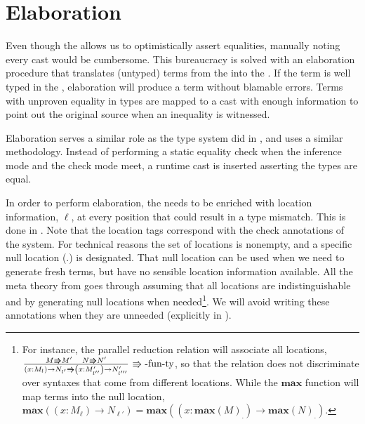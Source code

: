 \section{Elaboration}


Even though the \clang{} allows us to optimistically assert equalities, manually noting every cast would be cumbersome.
This bureaucracy is solved with an elaboration procedure that translates (untyped) terms from the \slang{} into the \clang{}.
If the term is well typed in the \slang{}, elaboration will produce a term without blamable errors.
Terms with unproven equality in types are mapped to a cast with enough information to point out the original source when an inequality is witnessed.
 
Elaboration serves a similar role as the \bidir{} type system did in , and uses a similar methodology.
Instead of performing a static equality check when the inference mode and the check mode meet, a runtime cast is inserted asserting the types are equal.

In order to perform elaboration, the \slang{} needs to be enriched with location information, $\ell$, at every position that could result in a type mismatch.
This is done in .
Note that the location tags correspond with the check annotations of the \bidir{} system.
For technical reasons the set of locations is nonempty, and a specific null location ($.$) is designated.
That null location can be used when we need to generate fresh terms, but have no sensible location information available.
All the meta theory from  goes through assuming that all locations are indistinguishable and by generating null locations when needed\footnote{
  For instance, the parallel reduction relation will associate all locations,
    $\frac{M\Rrightarrow M'\quad N\Rrightarrow N'}{\left(x:M_{l}\right)\rightarrow N_{l'}\Rrightarrow\left(x:M'_{l''}\right)\rightarrow N'_{l'''}}\,\operatorname{\Rrightarrow-fun-ty}$,
    so that the relation does not discriminate over syntaxes that come from different locations.
  While the $\textbf{max}$ function will map terms into the null location,
    $\textbf{max}\left(\left(x:M_{\ell}\right)\rightarrow N_{\ell'}\right)=\textbf{max}\left(\left(x:\textbf{max}\left(M\right)_{.}\right)\rightarrow \textbf{max}\left(N\right)_{.}\right)$.
}.
We will avoid writing these annotations when they are unneeded (explicitly in ).

